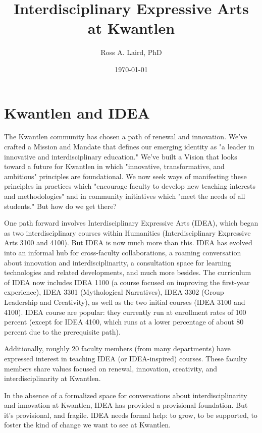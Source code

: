 \documentclass[letterpaper,10pt,headsepline]{scrreprt}
\author{Ross A. Laird, PhD}
\title{Interdisciplinary Expressive Arts\\ at Kwantlen}
\date{\today}
\begin{document}
\begin{titlingpage}
\begin{center}
\maketitle
\end{center}
\end{titlingpage}
\tableofcontents

\section{Kwantlen and IDEA}

The Kwantlen community has chosen a path of renewal and innovation. We've crafted a Mission and Mandate that defines our emerging identity as "a leader in innovative and interdisciplinary education." We've built a Vision that looks toward a future for Kwantlen in which "innovative, transformative, and ambitious" principles are foundational. We now seek ways of manifesting these principles in practices which "encourage faculty to develop new teaching interests and methodologies" and in community initiatives which "meet the needs of all students." But how do we get there?

One path forward involves Interdisciplinary Expressive Arts (IDEA), which began as two interdisciplinary courses within Humanities (Interdisciplinary Expressive Arts 3100 and 4100). But IDEA is now much more than this. IDEA has evolved into an informal hub for cross-faculty collaborations, a roaming conversation about innovation and interdisciplinarity, a consultation space for learning technologies and related developments, and much more besides. The curriculum of IDEA now includes IDEA 1100 (a course focused on improving the first-year experience), IDEA 3301 (Mythological Narratives), IDEA 3302 (Group Leadership and Creativity), as well as the two initial courses (IDEA 3100 and 4100). IDEA course are popular: they currently run at enrollment rates of 100 percent (except for IDEA 4100, which runs at a lower percentage of about 80 percent due to the prerequisite path).

Additionally, roughly 20 faculty members (from many departments) have expressed interest in teaching IDEA (or IDEA-inspired) courses. These faculty members share values focused on renewal, innovation, creativity, and interdisciplinarity at Kwantlen.

In the absence of a formalized space for conversations about interdisciplinarity and innovation at Kwantlen, IDEA has provided a provisional foundation. But it's provisional, and fragile. IDEA needs formal help: to grow, to be supported, to foster the kind of change we want to see at Kwantlen.
\end{document}
